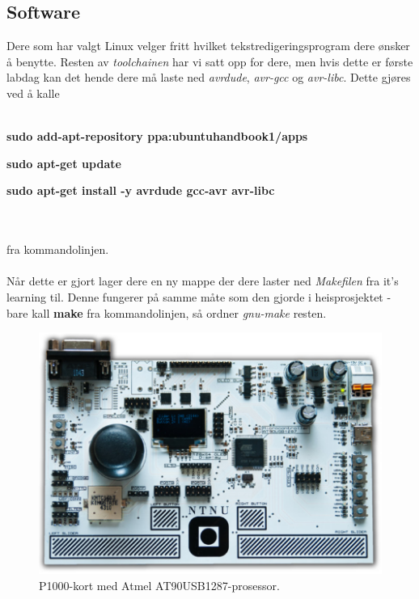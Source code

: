 \documentclass[11pt,a4paper]{article}
\begin{document}
\subsection{Software}
Dere som har valgt Linux velger fritt hvilket tekstredigeringsprogram dere ønsker å benytte. Resten av \textit{toolchainen} har vi satt opp for dere, men hvis dette er første labdag kan det hende dere må laste ned \textit{avrdude}, \textit{avr-gcc} og \textit{avr-libc}. Dette gjøres ved å kalle\\
\\
\centerline{\textbf{sudo add-apt-repository ppa:ubuntuhandbook1/apps}}
\centerline{\textbf{sudo apt-get update}}
\centerline{\textbf{sudo apt-get install -y avrdude gcc-avr avr-libc}}\\
\\
fra kommandolinjen.\\
\\
Når dette er gjort lager dere en ny mappe der dere laster ned \textit{Makefilen} fra it's learning til. Denne fungerer på samme måte som den gjorde i heisprosjektet - bare kall \textbf{make} fra kommandolinjen, så ordner \textit{gnu-make} resten.
\begin{figure}[!h]
\centering
\includegraphics[width=0.8\linewidth]{p1000.png}
\caption{P1000-kort med Atmel AT90USB1287-prosessor.}
\label{p1000::card}
\end{figure}
\end{document}
